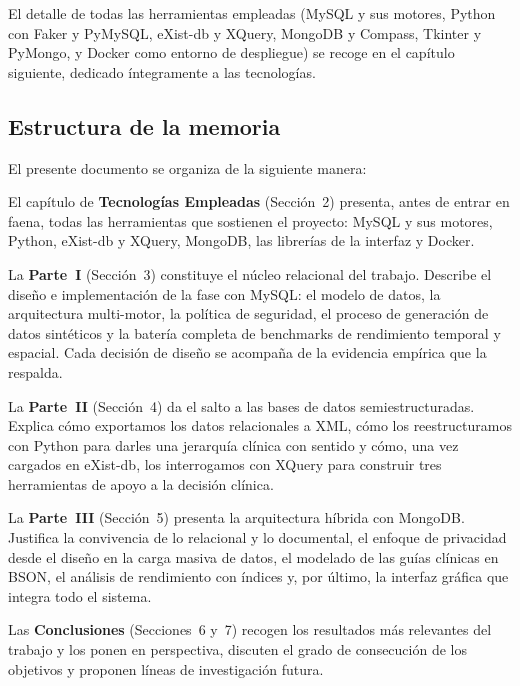 \documentclass[../main.tex]{subfiles}
\begin{document}
El detalle de todas las herramientas empleadas (MySQL y sus motores, Python con Faker y PyMySQL, eXist-db y XQuery, MongoDB y Compass, Tkinter y PyMongo, y Docker como entorno de despliegue) se recoge en el capítulo siguiente, dedicado íntegramente a las tecnologías.

\subsection{Estructura de la memoria}

El presente documento se organiza de la siguiente manera:

El capítulo de \textbf{Tecnologías Empleadas} (Sección~2) presenta, antes de entrar en faena, todas las herramientas que sostienen el proyecto: MySQL y sus motores, Python, eXist-db y XQuery, MongoDB, las librerías de la interfaz y Docker.

La \textbf{Parte~I} (Sección~3) constituye el núcleo relacional del trabajo. Describe el diseño e implementación de la fase con MySQL: el modelo de datos, la arquitectura multi-motor, la política de seguridad, el proceso de generación de datos sintéticos y la batería completa de benchmarks de rendimiento temporal y espacial. Cada decisión de diseño se acompaña de la evidencia empírica que la respalda.

La \textbf{Parte~II} (Sección~4) da el salto a las bases de datos semiestructuradas. Explica cómo exportamos los datos relacionales a XML, cómo los reestructuramos con Python para darles una jerarquía clínica con sentido y cómo, una vez cargados en eXist-db, los interrogamos con XQuery para construir tres herramientas de apoyo a la decisión clínica.

La \textbf{Parte~III} (Sección~5) presenta la arquitectura híbrida con MongoDB. Justifica la convivencia de lo relacional y lo documental, el enfoque de privacidad desde el diseño en la carga masiva de datos, el modelado de las guías clínicas en BSON, el análisis de rendimiento con índices y, por último, la interfaz gráfica que integra todo el sistema.

Las \textbf{Conclusiones} (Secciones~6 y~7) recogen los resultados más relevantes del trabajo y los ponen en perspectiva, discuten el grado de consecución de los objetivos y proponen líneas de investigación futura.
\end{document}
